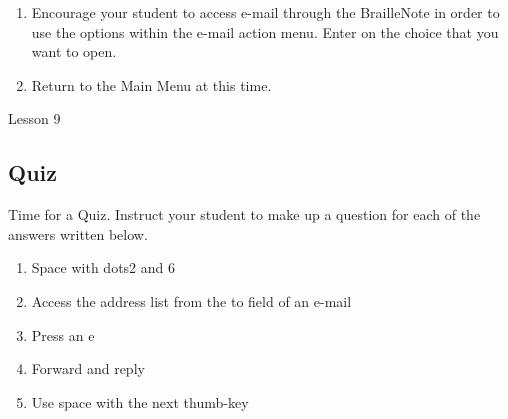 \documentclass[10pt,letterpaper,twoside]{report}
\begin{document}
{{{{\begin{enumerate}
\begin{enumerate}
		      \item Copy this e-mail to another folder
		            
		      \item Delete this e-mail from this folder
		            
		      \item Print this e-mail
		            
		      \item Emboss this e-mail
		            
		      \item All. Mark all e-mail
		            
		            
	      \end{enumerate}
	\item Encourage your student to access e-mail through the BrailleNote in order to use the options within the e-mail action menu.  Enter on the choice that you want to open.
	      
	\item Return to the Main Menu at this time.
\end{enumerate}





\clearpage

\newpage
Lesson 9

\subsection{Quiz}



Time for a Quiz.  Instruct your student to make up a question for each of the answers written below.



\begin{enumerate}
	\item Space with dots2 and 6
	      
	\item Access the address list from the to field of an e-mail
	      
	\item Press an e
	      
	\item Forward and reply
	      
	\item Use space with the next thumb-key
\end{enumerate}



}}}}
\end{document}
